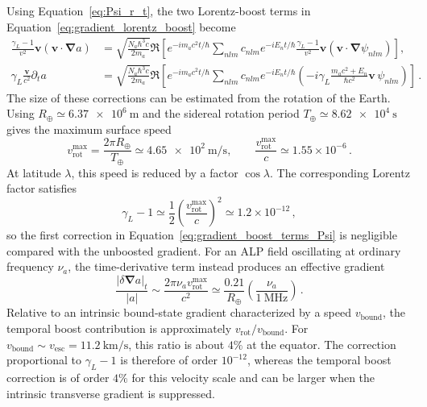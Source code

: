 Using Equation~\eqref{eq:Psi_r_t}, the two Lorentz-boost terms in Equation~\eqref{eq:gradient_lorentz_boost} become
\begin{align}
    \frac{\gamma_L-1}{v^2}\mathbf{v}
    \left(\mathbf{v}\cdot\boldsymbol{\nabla}a\right)
    &=
    \sqrt{\frac{N_a \hbar^3 c}{2 m_a}}
    \Re\left[
    e^{-i m_a c^2 t/\hbar}
    \sum_{nlm} c_{nlm}e^{-iE_nt/\hbar}
    \frac{\gamma_L-1}{v^2}\mathbf{v}
    \left(\mathbf{v}\cdot\boldsymbol{\nabla}\psi_{nlm}\right)
    \right],
    \\
    \gamma_L\frac{\mathbf{v}}{c^2}\partial_t a
    &=
    \sqrt{\frac{N_a \hbar^3 c}{2 m_a}}
    \Re\left[
    e^{-i m_a c^2 t/\hbar}
    \sum_{nlm} c_{nlm}e^{-iE_nt/\hbar}
    \left(
    -i\gamma_L\frac{m_a c^2+E_n}{\hbar c^2}
    \mathbf{v}\,\psi_{nlm}
    \right)
    \right]
    \,.\label{eq:gradient_boost_terms_Psi}
\end{align}
The size of these corrections can be estimated from the rotation of the Earth.
Using $R_\oplus\simeq\SI{6.37e6}{\meter}$ and the sidereal rotation period $T_\oplus\simeq\SI{8.62e4}{\second}$ gives the maximum surface speed
\begin{equation}
    v_\mathrm{rot}^{\max}
    =
    \frac{2\pi R_\oplus}{T_\oplus}
    \simeq\SI{4.65e2}{\meter\per\second},
    \qquad
    \frac{v_\mathrm{rot}^{\max}}{c}
    \simeq 1.55\times10^{-6}
    \,.
\end{equation}
At latitude $\lambda$, this speed is reduced by a factor $\cos\lambda$.
The corresponding Lorentz factor satisfies
\begin{equation}
    \gamma_L-1
    \simeq
    \frac{1}{2}\left(\frac{v_\mathrm{rot}^{\max}}{c}\right)^2
    \simeq 1.2\times10^{-12}
    \,,
\end{equation}
so the first correction in Equation~\eqref{eq:gradient_boost_terms_Psi} is negligible compared with the unboosted gradient.
For an ALP field oscillating at ordinary frequency $\nu_a$, the time-derivative term instead produces an effective gradient
\begin{equation}
    \frac{\left|\delta\boldsymbol{\nabla}a\right|_t}{|a|}
    \sim
    \frac{2\pi\nu_a v_\mathrm{rot}^{\max}}{c^2}
    \simeq
    \frac{0.21}{R_\oplus}
    \left(\frac{\nu_a}{\SI{1}{\mega\hertz}}\right)
    \,.
\end{equation}
Relative to an intrinsic bound-state gradient characterized by a speed
$v_\mathrm{bound}$, the temporal boost contribution is approximately
$v_\mathrm{rot}/v_\mathrm{bound}$.
For $v_\mathrm{bound}\sim v_\mathrm{esc}=\SI{11.2}{\kilo\meter\per\second}$,
this ratio is about $4\%$ at the equator.
The correction proportional to $\gamma_L-1$ is therefore of order
$10^{-12}$, whereas the temporal boost correction is of order $4\%$ for
this velocity scale and can be larger when the intrinsic transverse
gradient is suppressed.

